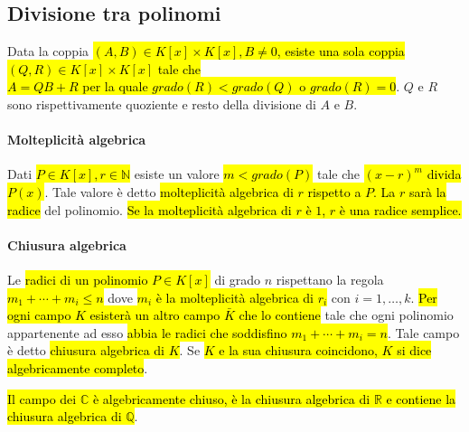 \subsection{Divisione tra polinomi}
Data la coppia \hl{$(A, B) \in K[x] \times K[x], B \neq 0$, esiste una sola coppia
$(Q, R) \in K[x] \times K[x]$ tale che \\ $A = QB + R$ per la quale $grado(R) < grado(Q)$
o $grado(R) = 0$}. $Q$ e $R$ sono rispettivamente quoziente e resto della divisione
di $A$ e $B$.

\paragraph{Molteplicità algebrica} Dati \hl{$P \in K[x], r \in \mathbb{N}$} esiste
un valore \hl{$m < grado(P)$} tale che \hl{${(x-r)}^m$ divida $P(x)$}. Tale valore è
detto \hl{molteplicità algebrica di $r$ rispetto a $P$. La $r$ sarà la radice} del
polinomio. \hl{Se la molteplicità algebrica di $r$ è $1$, $r$ è una radice semplice.}

\paragraph{Chiusura algebrica} Le \hl{radici di un polinomio $P \in K[x]$} di grado
$n$ rispettano la regola \\ \hl{$m_1 + \cdots + m_i \leq n$} dove \hl{$m_i$ è la
molteplicità algebrica di $r_i$} con $i = 1, \ldots, k$. \hl{Per ogni campo $K$
esisterà un altro campo $\bar{K}$ che lo contiene} tale che ogni polinomio
appartenente ad esso \hl{abbia le radici che soddisfino $m_1 + \cdots + m_i = n$}.
Tale campo è detto \hl{chiusura algebrica di $K$}. Se \hl{$K$ e la sua chiusura
coincidono, $K$ si dice algebricamente completo}.

\hl{Il campo dei $\mathbb{C}$ è algebricamente chiuso, è la chiusura algebrica di
$\mathbb{R}$ e contiene la chiusura algebrica di $\mathbb{Q}$}. 
